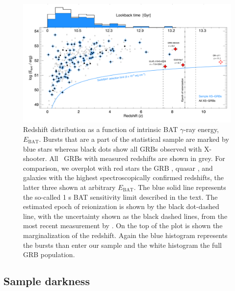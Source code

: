 \documentclass[longauth]{aa}    %
\begin{document}
\begin{figure}[!ht]
	\centering \includegraphics[width=\linewidth]{figures/XSGRB_redshift.pdf}
\caption{Redshift distribution as a function of intrinsic BAT $\gamma$-ray
	energy, $E_{\mathrm{BAT}}$. Bursts that are a part of the statistical sample
	are marked by blue stars whereas black dots show all GRBs observed with
	X-shooter. All \swift~GRBs with measured redshifts are shown in grey. For
	comparison, we overplot with red stars the GRB \citep{Tanvir2009b,
		Salvaterra2009a}, quasar \citep{Banados2017}, and galaxies \citep{Zitrin2015,
		Oesch2016} with the highest spectroscopically confirmed redshifts, the latter
	three shown at arbitrary $E_{\mathrm{BAT}}$. The blue solid line represents the
	so-called 1 s BAT sensitivity limit described in the text. The estimated epoch
	of reionization is shown by the black dot-dashed line, with the uncertainty
	shown as the black dashed lines, from the most recent measurement by
	\citet{Planck2015}. On the top of the plot is shown the marginalization of the
	redshift. Again the blue histogram represents the bursts than enter our sample
	and the white histogram the full GRB population. } \label{fig:z}
\end{figure}



\subsection{Sample darkness} \label{darkness}
\end{document}
